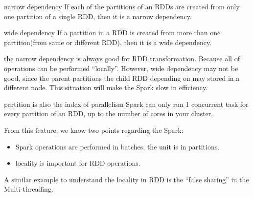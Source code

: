 \documentclass[notheorems, aspectratio=54]{beamer}
\begin{document}
\begin{frame}

\begin{block}{narrow dependency}
 If each of the partitions of an RDDs are created from only one partition of a single RDD, then it is a narrow dependency. 
\end{block}

\begin{block}{wide dependency}
 If a partition in a RDD is created from more than one partition(from same or different RDD), then it is a wide dependency.
\end{block}

the narrow dependency is always good for RDD transformation. Because all of operations can be performed ``locally''. 
However, wide dependency may not be good, since the parent partitions the child RDD depending on may stored in 
a different node. This situation will make the Spark slow in efficiency. 

\end{frame}


\begin{frame}

\begin{alertblock}{ partition is also the index of parallelism}
 Spark can only run 1 concurrent task for every partition of an RDD, up to the number of cores in your cluster. 
\end{alertblock}

From this feature, we know two points regarding the Spark:
\begin{itemize}
 \item Spark operations are performed in batches, the unit is in partitions. 
 \item locality is important for RDD operations. 
\end{itemize}
A similar example to understand the locality in RDD is the ``false sharing'' in the Multi-threading.

\end{frame}

\end{document}
